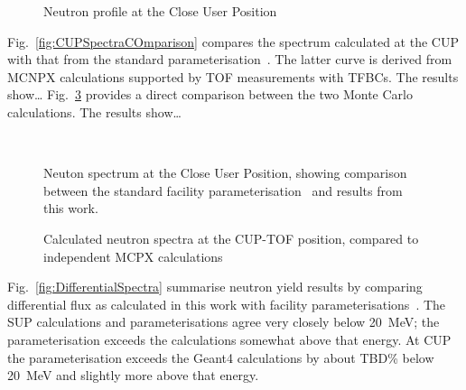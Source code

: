 \documentclass[12pt,journal]{IEEEtran}
\let\MYoriglatexcaption\caption
\renewcommand{\caption}[2][\relax]{\MYoriglatexcaption[#2]{#2}}
\begin{document}
\begin{figure}[t]
    \vspace{2in}
    \caption{Neutron profile at the Close User Position}
    \label{fig:CUPProfile}
\end{figure}

Fig.~\ref{fig:CUPSpectraCOmparison} compares the spectrum calculated at the CUP with that from the standard parameterisation~\cite{Prokofiev14}.
The latter curve is derived from MCNPX calculations supported by TOF measurements with TFBCs.
The results show\ldots{}
Fig.~\ref{fig:MCComparison} provides a direct comparison between the two Monte Carlo calculations.
The results show\ldots{}

\begin{figure}[t]
    \vspace{2in}
	\\
    \vspace{2in}
	\caption{Neuton spectrum at the Close User Position, showing comparison between the standard facility parameterisation~\cite{Prokofiev2009} and results from this work.}
	\label{fig:CUPSpectraComparison}
\end{figure}

\begin{figure}[t]
    \vspace{2in}
    \caption{Calculated neutron spectra at the CUP-TOF position, compared to independent MCPX calculations~\cite{Prokofiev14}}
    \label{fig:MCComparison}
\end{figure}

Fig.~\ref{fig:DifferentialSpectra} summarise neutron yield results by comparing differential flux as calculated in this work with facility parameterisations~\cite{Prokofiev2009,Prokofiev14}.
The SUP calculations and parameterisations agree very closely below \SI{20}{\MeV}; the parameterisation exceeds the calculations somewhat above that energy.
At CUP the parameterisation exceeds the Geant4 calculations by about TBD\% below \SI{20}{\MeV} and slightly more above that energy.
\end{document}
